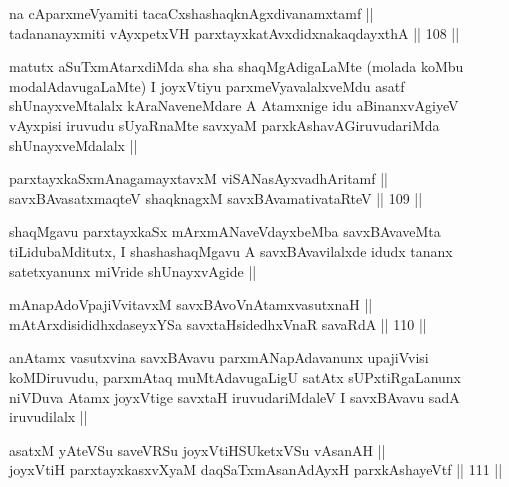 \begin{shl}
na cAparxmeVyamiti tacaCxshashaqknAgxdivanamxtamf ||  \\
tadananayxmiti vAyxpetxVH parxtayxkatAvxdidxnakaqdayxthA ||  108 ||  
\end{shl}

\begin{artha}
matutx aSuTxmAtarxdiMda sha sha shaqMgAdigaLaMte (molada koMbu modalAdavugaLaMte) I joyxVtiyu parxmeVyavalalxveMdu asatf shUnayxveMtalalx kAraNaveneMdare A Atamxnige idu aBinanxvAgiyeV vAyxpisi iruvudu sUyaRnaMte savxyaM parxkAshavAGiruvudariMda shUnayxveMdalalx ||
\end{artha}


\begin{shl}
parxtayxkaSxmAnagamayxtavxM viSANasAyxvadhAritamf || \\
savxBAvasatxmaqteV shaqknagxM savxBAvamativataRteV ||  109 ||  
\end{shl}

\begin{artha}
shaqMgavu parxtayxkaSx mArxmANaveVdayxbeMba savxBAvaveMta tiLidubaMditutx, I shashashaqMgavu A savxBAvavilalxde idudx tananx satetxyanunx miVride shUnayxvAgide ||
\end{artha}


\begin{shl}
mAnapAdoVpajiVvitavxM savxBAvoV\s nAtamxvasutxnaH || \\
mAtArxdisididhxdaseyxYSa savxtaHsidedhxVnaR savaRdA ||  110 ||  
\end{shl}

\begin{artha}
anAtamx vasutxvina savxBAvavu parxmANapAdavanunx upajiVvisi koMDiruvudu, parxmAtaq muMtAdavugaLigU satAtx sUPxtiRgaLanunx niVDuva Atamx joyxVtige savxtaH iruvudariMdaleV I savxBAvavu sadA iruvudilalx ||
\end{artha}


\begin{shl}
asatxM yAteVSu saveVRSu joyxVtiHSUketxVSu vAsanAH || \\
joyxVtiH parxtayxkasxvXyaM daqSaTxmAsanAdAyxH parxkAshayeVtf ||  111 ||  
\end{shl}

